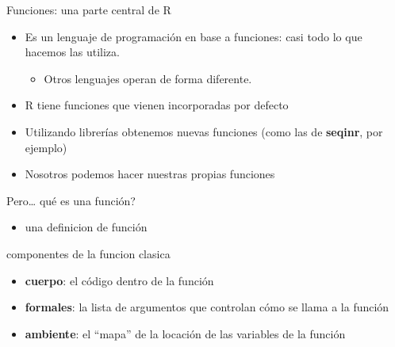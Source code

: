 \documentclass[ignorenonframetext,]{beamer}
\providecommand{\tightlist}{%
  \setlength{\itemsep}{0pt}\setlength{\parskip}{0pt}}
\begin{document}
\begin{frame}{Funciones: una parte central de R}
\protect\hypertarget{funciones-una-parte-central-de-r}{}

\begin{itemize}
\tightlist
\item
  Es un lenguaje de programación en base a funciones: casi todo lo que
  hacemos las utiliza.

  \begin{itemize}
  \tightlist
  \item
    Otros lenguajes operan de forma diferente.
  \end{itemize}
\item
  R tiene funciones que vienen incorporadas por defecto
\item
  Utilizando librerías obtenemos nuevas funciones (como las de
  \textbf{seqinr}, por ejemplo)
\item
  Nosotros podemos hacer nuestras propias funciones
\end{itemize}

\end{frame}

\begin{frame}{Pero\ldots{} qué es una función?}
\protect\hypertarget{pero-quuxe9-es-una-funciuxf3n}{}

\begin{itemize}
\tightlist
\item
  una definicion de función
\end{itemize}

\end{frame}

\begin{frame}{componentes de la funcion clasica}
\protect\hypertarget{componentes-de-la-funcion-clasica}{}

\begin{itemize}
\tightlist
\item
  \textbf{cuerpo}: el código dentro de la función
\item
  \textbf{formales}: la lista de argumentos que controlan cómo se llama
  a la función
\item
  \textbf{ambiente}: el ``mapa'' de la locación de las variables de la
  función
\end{itemize}

\end{frame}
\end{document}
